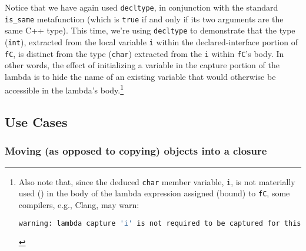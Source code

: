 \noindent Notice that we have again used \lstinline!decltype!, in conjunction with
the standard \lstinline!is_same! metafunction (which is \lstinline!true! if
and only if its two arguments are the same C++ type). This time, we're using \lstinline!decltype! to
demonstrate that the type (\lstinline!int!), extracted from the local
variable \lstinline!i! within the declared-interface portion of
\lstinline!fC!, is distinct from the type (\lstinline!char!) extracted from
the \lstinline!i! within \lstinline!fC!'s body. In other words, the effect
of initializing a variable in the capture portion of the lambda is to
hide the name of an existing variable that would otherwise be accessible
in the lambda's body.{\cprotect\footnote{Also note that, since the
deduced \lstinline!char! member variable, \lstinline!i!, is not materially
used () in the body of the lambda expression assigned
(bound) to \lstinline!fC!, some compilers, e.g., Clang, may warn:

\begin{lstlisting}[language=bash,style=footcodeplain]
warning: lambda capture 'i' is not required to be captured for this use
\end{lstlisting}
      }}

\pagebreak%
\subsection[Use Cases]{Use Cases}\label{use-cases-lambdacapture}

\subsubsection[Moving (as opposed to copying) objects into a closure]{Moving (as opposed to copying) objects into a closure}\label{moving-(as-opposed-to-copying)-objects-into-a-closure}

